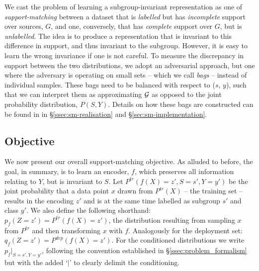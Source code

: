 

We cast the problem of learning a subgroup-invariant representation as one of
\emph{support-matching} between a dataset that is \emph{labelled} but has \emph{incomplete} support
over sources, $G$, and one, conversely, that has \emph{complete} support over $G$, but is
\emph{unlabelled}. 
%
The idea is to produce a representation that is invariant to this difference in support, and thus
invariant to the subgroup. However, it is easy to learn the wrong invariance if one is not careful.
To measure the discrepancy in support between the two distributions, we adopt an adversarial
approach, but one where the adversary is operating on small sets -- which we call \emph{bags} --
instead of individual samples. These bags need to be balanced with respect to ($s$, $y$), such that
we can interpret them as approximating ${\mathcal{G}}$ as opposed to the joint probability distribution,
$P(S, Y)$.
%
Details on how these bags are constructed can be found in in \S\ref{ssec:sm-realisation} and
\S\ref{sec:sm-implementation}.


\subsection{Objective}\label{ssec:sm-objective}
%
We now present our overall support-matching objective. 
%
As alluded to before, the goal, in summary, is to learn an encoder, \(f\), which
preserves all information relating to $Y$, but is invariant to $S$. 
Let \(P^{tr}(f(X)=z', S=s',Y=y')\) be the joint probability that a data point \(x\) drawn
from \(P^{tr}(X)\) -- the training set -- results in the encoding \(z'\) and is at the same
time labelled as subgroup \(s'\) and class \(y'\). 
%
We also define the following shorthand: $p_f(Z=z')=P^{tr}(f(X)=z')$, the distribution
resulting from sampling \(x\) from \(P^{tr}\) and then transforming \(x\) with \(f\).
%
Analogously for the deployment set: $q_f(Z=z')=P^{dep}(f(X)=z')$. 
%
For the conditioned distributions we write $p_f|_{S=s',Y=y'}$, following the convention established
in \S\ref{ssec:problem_formalism} but with the added `\(|\)' to clearly delimit the
conditioning.

